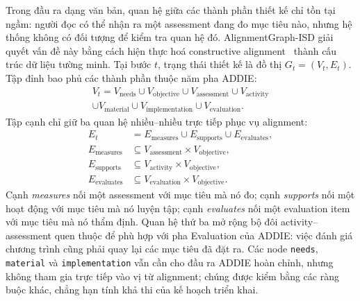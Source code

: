 Trong đầu ra dạng văn bản, quan hệ giữa các thành phần thiết kế chỉ tồn tại ngầm: người
đọc có thể nhận ra một assessment đang đo mục tiêu nào, nhưng hệ thống không có đối
tượng để kiểm tra quan hệ đó. AlignmentGraph-ISD giải quyết vấn đề này bằng cách hiện
thực hoá constructive alignment~\cite{biggs1996enhancing} thành cấu trúc dữ liệu tường
minh. Tại bước $t$, trạng thái thiết kế là đồ thị $G_t=(V_t,E_t)$. Tập đỉnh bao phủ các
thành phần thuộc năm pha ADDIE:
\begin{multline*}
V_t = V_{\mathrm{needs}} \cup V_{\mathrm{objective}} \cup V_{\mathrm{assessment}} \cup V_{\mathrm{activity}} \\
 \cup V_{\mathrm{material}} \cup V_{\mathrm{implementation}} \cup V_{\mathrm{evaluation}}.
\end{multline*}
Tập cạnh chỉ giữ ba quan hệ nhiều--nhiều trực tiếp phục vụ alignment:
\begin{align*}
E_t &= E_{\mathrm{measures}} \cup E_{\mathrm{supports}} \cup E_{\mathrm{evaluates}},\\
E_{\mathrm{measures}} &\subseteq V_{\mathrm{assessment}} \times V_{\mathrm{objective}},\\
E_{\mathrm{supports}} &\subseteq V_{\mathrm{activity}} \times V_{\mathrm{objective}},\\
E_{\mathrm{evaluates}} &\subseteq V_{\mathrm{evaluation}} \times V_{\mathrm{objective}}.
\end{align*}
Cạnh \textsl{measures} nối một assessment với mục tiêu mà nó đo; cạnh
\textsl{supports} nối một hoạt động với mục tiêu mà nó luyện tập; cạnh
\textsl{evaluates} nối một evaluation item với mục tiêu mà nó thẩm định. Quan hệ thứ ba
mở rộng bộ đôi activity--assessment quen thuộc để phù hợp với pha Evaluation của ADDIE:
việc đánh giá chương trình cũng phải quay lại các mục tiêu đã đặt ra. Các node
\texttt{needs}, \texttt{material} và \texttt{implementation} vẫn cần cho đầu ra ADDIE
hoàn chỉnh, nhưng không tham gia trực tiếp vào vị từ alignment; chúng được kiểm bằng các
ràng buộc khác, chẳng hạn tính khả thi của kế hoạch triển khai.

